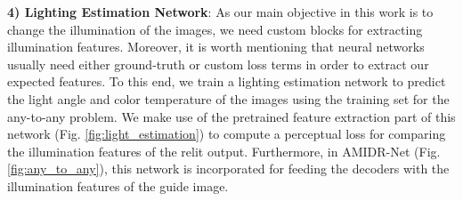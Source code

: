 \documentclass[final]{cvpr}
\newcommand{\squeezeup}{\vspace{-5mm}}
\newcommand{\smallsqueezeup}{\vspace{-2mm}}
\begin{document}
\textbf{4) Lighting Estimation Network}: As our main objective in this work is to change the illumination of the images, we need custom blocks for extracting illumination features. Moreover, it is worth mentioning that neural networks usually need either ground-truth or custom loss terms in order to extract our expected features. To this end, we train a lighting estimation network to predict the light angle and color temperature of the images using the training set for the any-to-any problem. We make use of the pretrained feature extraction part of this network (Fig. \ref{fig:light_estimation}) to compute a perceptual loss for comparing the illumination features of the relit output. Furthermore, in AMIDR-Net (Fig. \ref{fig:any_to_any}), this network is incorporated for feeding the decoders with the illumination features of the guide image.
\begin{table*}[]\centering\caption{Decoder Structure. (for OIDDR-Net the input to the decoder doesn't include lighting estimation outputs.) C depends on the functionality of the decoder.}\squeezeup\label{tb:decoder}\medskip
{}
\smallsqueezeup
\smallsqueezeup
\smallsqueezeup
\end{table*}
\end{document}
